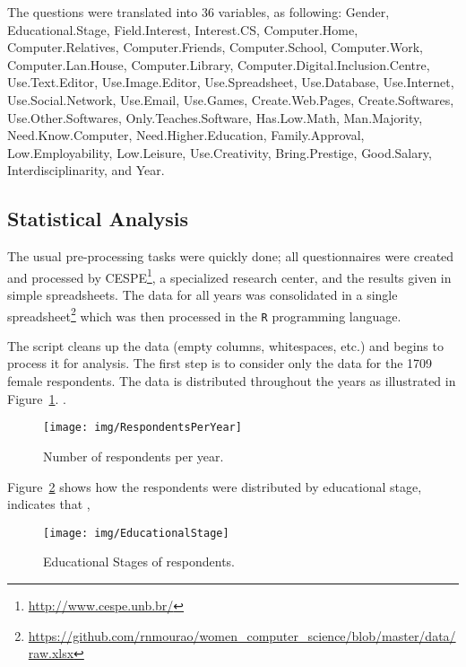 The questions were translated into 36 variables, as following: Gender, Educational.Stage, Field.Interest, Interest.CS, Computer.Home, Computer.Relatives, Computer.Friends, Computer.School, Computer.Work, Computer.Lan.House, Computer.Library, Computer.Digital.Inclusion.Centre, Use.Text.Editor, Use.Image.Editor, Use.Spreadsheet, Use.Database, Use.Internet, Use.Social.Network, Use.Email, Use.Games, Create.Web.Pages, Create.Softwares, Use.Other.Softwares, Only.Teaches.Software, Has.Low.Math, Man.Majority, Need.Know.Computer, Need.Higher.Education, Family.Approval, Low.Employability, Low.Leisure, Use.Creativity, Bring.Prestige, Good.Salary, Interdisciplinarity, and Year.


\subsection{Statistical Analysis}\label{sec:mining:stat}%
The usual pre-processing tasks were quickly done; all questionnaires were created and processed by CESPE\footnote{\url{http://www.cespe.unb.br/}}, a specialized research center, and the results given in simple spreadsheets. The data for all years was consolidated in a single spreadsheet\footnote{\url{https://github.com/rnmourao/women\_computer\_science/blob/master/data/raw.xlsx}}
which was then processed in the \texttt{R} programming language.

The script cleans up the data (empty columns, whitespaces, etc.) and begins to process it for analysis. The first step is to consider only the data for the 1709 female respondents. The data is distributed throughout the years as illustrated in Figure~\ref{fig:RespondentsPerYear}. .

\begin{figure}%
\texttt{[image: img/RespondentsPerYear]}%
\caption{Number of respondents per year.}%
\label{fig:RespondentsPerYear}%
\end{figure}%

Figure~\ref{fig:EducationalStage} shows how the respondents were distributed by educational stage, indicates that ,

\begin{figure}%
\texttt{[image: img/EducationalStage]}%
\caption{Educational Stages of respondents.}%
\label{fig:EducationalStage}%
\end{figure}%

